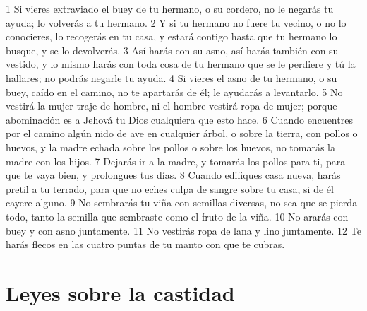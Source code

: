 1 Si vieres extraviado el buey de tu hermano, o su cordero, no le negarás tu ayuda; lo volverás a tu hermano.
2 Y si tu hermano no fuere tu vecino, o no lo conocieres, lo recogerás en tu casa, y estará contigo hasta que tu hermano lo busque, y se lo devolverás.
3 Así harás con su asno, así harás también con su vestido, y lo mismo harás con toda cosa de tu hermano que se le perdiere y tú la hallares; no podrás negarle tu ayuda.
4 Si vieres el asno de tu hermano, o su buey, caído en el camino, no te apartarás de él; le ayudarás a levantarlo. 
5 No vestirá la mujer traje de hombre, ni el hombre vestirá ropa de mujer; porque abominación es a Jehová tu Dios cualquiera que esto hace.
6 Cuando encuentres por el camino algún nido de ave en cualquier árbol, o sobre la tierra, con pollos o huevos, y la madre echada sobre los pollos o sobre los huevos, no tomarás la madre con los hijos.
7 Dejarás ir a la madre, y tomarás los pollos para ti, para que te vaya bien, y prolongues tus días.
8 Cuando edifiques casa nueva, harás pretil a tu terrado, para que no eches culpa de sangre sobre tu casa, si de él cayere alguno.
9 No sembrarás tu viña con semillas diversas, no sea que se pierda todo, tanto la semilla que sembraste como el fruto de la viña.
10 No ararás con buey y con asno juntamente.
11 No vestirás ropa de lana y lino juntamente. 
12 Te harás flecos en las cuatro puntas de tu manto con que te cubras. 

\section{Leyes sobre la castidad}


